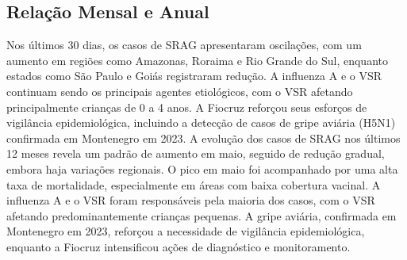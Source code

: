 \documentclass{article}%
\begin{document}
%
\subsection{Relação Mensal e Anual}%
\label{subsec:RelaoMensaleAnual}%
Nos últimos 30 dias, os casos de SRAG apresentaram oscilações, com um aumento em regiões como Amazonas, Roraima e Rio Grande do Sul, enquanto estados como São Paulo e Goiás registraram redução. A influenza A e o VSR continuam sendo os principais agentes etiológicos, com o VSR afetando principalmente crianças de 0 a 4 anos. A Fiocruz reforçou seus esforços de vigilância epidemiológica, incluindo a detecção de casos de gripe aviária (H5N1) confirmada em Montenegro em 2023.\newline%
%
A evolução dos casos de SRAG nos últimos 12 meses revela um padrão de aumento em maio, seguido de redução gradual, embora haja variações regionais. O pico em maio foi acompanhado por uma alta taxa de mortalidade, especialmente em áreas com baixa cobertura vacinal. A influenza A e o VSR foram responsáveis pela maioria dos casos, com o VSR afetando predominantemente crianças pequenas. A gripe aviária, confirmada em Montenegro em 2023, reforçou a necessidade de vigilância epidemiológica, enquanto a Fiocruz intensificou ações de diagnóstico e monitoramento.\newline%
%
\end{document}
